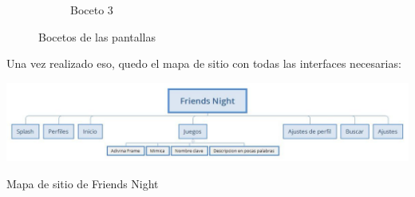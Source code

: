 \documentclass[12pt, oneside, letterpaper]{book}
\begin{document}
\begin{figure}[h]
\begin{subfigure}{.3\textwidth}
        \caption{Boceto 3 }
        \label{BP3FN}
    \end{subfigure}
		\caption{Bocetos de las pantallas}
		\label{BPFN}
\end{figure}
\par Una vez realizado eso, quedo el mapa de sitio con todas las interfaces necesarias: 
\begin{center}
	\centering
		\includegraphics[width=1.2\textwidth]{MapaDeSitioFN.jpeg}

	\caption{Mapa de sitio de Friends Night}
	\label{MSFN}
\end{center}
\vspace{1cm}
\end{document}
